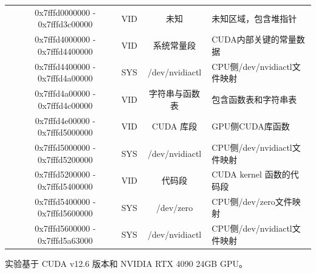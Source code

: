 \begin{table}[t]
\begin{threeparttable}
\begin{tabular}{ccccl}
                                         & \cellcolor[HTML]{EFEFEF}0x7fffd0000000 - 0x7fffd3c00000 & \cellcolor[HTML]{EFEFEF}VID           & \cellcolor[HTML]{EFEFEF}未知                & \cellcolor[HTML]{EFEFEF}未知区域，包含堆指针                                          \\
                                         & 0x7fffd4000000 - 0x7fffd4400000 & VID           & 系统常量段 & CUDA内部关键的常量数据   \\
                                         & \cellcolor[HTML]{EFEFEF}0x7fffd4400000 - 0x7fffd4a00000\tnote{*} & \cellcolor[HTML]{EFEFEF}SYS           & \cellcolor[HTML]{EFEFEF}/dev/nvidiactl         & \cellcolor[HTML]{EFEFEF}CPU侧/dev/nvidiactl文件映射                         \\
                                         & 0x7fffd4a00000 - 0x7fffd4c00000 & VID           & 字符串与函数表  & 包含函数表和字符串表                  \\
                                         & \cellcolor[HTML]{EFEFEF}0x7fffd4e00000 - 0x7fffd5000000 & \cellcolor[HTML]{EFEFEF}VID           & \cellcolor[HTML]{EFEFEF}CUDA 库段           & \cellcolor[HTML]{EFEFEF}GPU侧CUDA库函数                               \\
                                         & 0x7fffd5000000 - 0x7fffd5200000\tnote{*} & SYS           & /dev/nvidiactl         & CPU侧/dev/nvidiactl文件映射                         \\
                                         & \cellcolor[HTML]{EFEFEF}0x7fffd5200000 - 0x7fffd5400000 & \cellcolor[HTML]{EFEFEF}VID           & \cellcolor[HTML]{EFEFEF}代码段                  & \cellcolor[HTML]{EFEFEF}CUDA kernel 函数的代码段                                           \\
                                         & 0x7fffd5400000 - 0x7fffd5600000\tnote{*} & SYS           & /dev/zero              & CPU侧/dev/zero文件映射                              \\
                                         & \cellcolor[HTML]{EFEFEF}0x7fffd5600000 - 0x7fffd5a63000\tnote{*} & \cellcolor[HTML]{EFEFEF}SYS           & \cellcolor[HTML]{EFEFEF}/dev/nvidiactl         & \cellcolor[HTML]{EFEFEF}CPU侧/dev/nvidiactl文件映射                         \\ \hline
\end{tabular}
\begin{tablenotes}
\small
    \item[*] 实验基于 CUDA v12.6 版本和 NVIDIA RTX 4090 24GB GPU。
\end{tablenotes}
\end{threeparttable}
\end{table}

